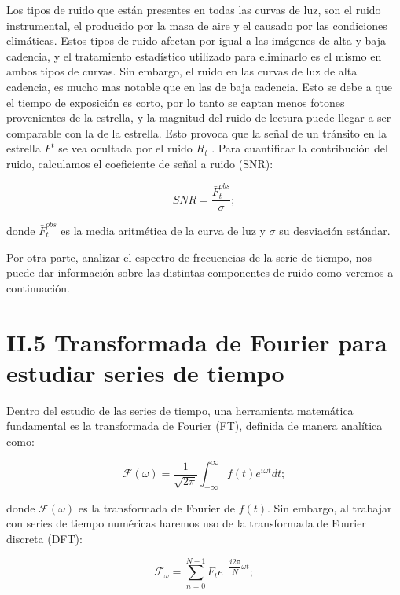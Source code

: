 Los tipos de ruido que están presentes en todas las curvas de luz, son el ruido instrumental, el producido por la masa de aire y el causado por las condiciones climáticas. Estos tipos de ruido afectan por igual a las imágenes de alta y baja cadencia, y el tratamiento estadístico utilizado para eliminarlo es el mismo en ambos tipos de curvas. Sin embargo, el ruido en las curvas de luz de alta cadencia, es mucho mas notable que en las de baja cadencia. Esto se debe a que el tiempo de exposición es corto, por lo tanto se captan menos fotones provenientes de la estrella, y la magnitud del ruido de lectura puede llegar a ser comparable con la de la estrella. Esto provoca que la señal de un tránsito en la estrella $F^{t}$  se vea ocultada por el ruido $R_{t}$ \cite{pont2006effect}. Para cuantificar la contribución del ruido, calculamos el coeficiente de señal a ruido (SNR):

\begin{equation}
  \displaystyle SNR=\dfrac{\bar{F}^{obs}_{t}}{\sigma};
\end{equation}

\noindent donde $\bar{F}^{obs}_{t}$ es la media aritmética de la curva de luz y $\sigma$ su desviación estándar.

Por otra parte, analizar el espectro de frecuencias de la serie de tiempo, nos puede dar información sobre las distintas componentes de ruido como veremos a continuación.

\section*{II.5 Transformada de Fourier para estudiar series de tiempo}

Dentro del estudio de las series de tiempo, una herramienta matemática fundamental es la transformada de Fourier (FT), definida de manera analítica como:

\begin{equation}
  \displaystyle \mathcal{F}(\omega )=\frac{1}{\sqrt{2\pi}}\int_{-\infty}^{\infty} f(t)e^{i\omega t}dt;
\end{equation}

\noindent donde $\mathcal{F}(\omega )$ es la transformada de Fourier de $f(t)$. Sin embargo, al trabajar con series de tiempo numéricas haremos uso de la transformada de Fourier discreta (DFT):  

\begin{equation}
  \displaystyle \mathcal{F}_{\omega}= \sum_{n=0}^{N-1} F_{t}e^{-\dfrac{i2\pi}{N}\omega t};
\end{equation}

